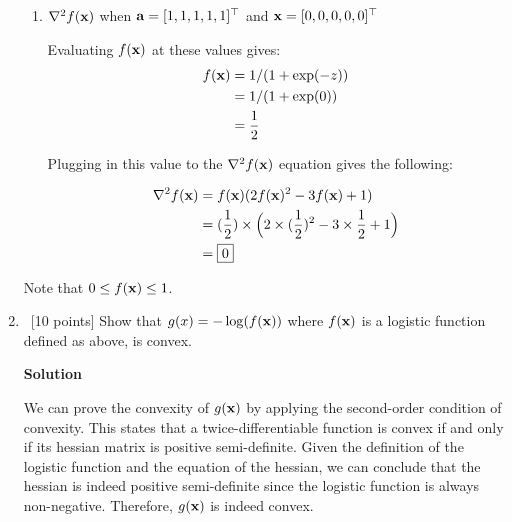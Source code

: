 \documentclass[12pt, fullpage,letterpaper]{article}
\newcommand{\solution}{\textbf{\large Solution}}
\begin{document}
\begin{enumerate}
\begin{enumerate}
\item $\nabla^2 f({\bf x})$  when ${\bf a} = [1,1,1,1,1]^\top$ and ${\bf x} = [0,0,0,0,0]^\top$

Evaluating $f({\bf x})$ at these values gives:
\[
	\begin{split}
		f({\bf x}) &= 1/(1+\exp(-z))
			\\
			&= 1/(1+\exp(0))
			\\
			&= \frac{1}{2}
	\end{split}
\]

Plugging in this value to the $\nabla^2 f({\bf x})$ equation gives the following:

	\[
		\begin{split}
			\nabla^2 f({\bf x}) &= f({\bf x})(2f({\bf x})^2 - 3 f({\bf x}) + 1)
				\\
				&= (\frac{1}{2})\times \Big(2\times(\frac{1}{2})^2 - 3 \times \frac{1}{2} + 1\Big)
				\\
				&= \boxed{0}
		\end{split}
	\]


\end{enumerate}
Note that $0 \le f({\bf x}) \le 1$.
\pagebreak
\label{sec:q8}
\item~[10 points] Show that $g(x) = -\log(f({\bf x}))$ where $f({\bf x})$ is a logistic function defined as above, is convex. 

\solution

We can prove the convexity of $g({\bf x})$ by applying the second-order condition of convexity. This states that a twice-differentiable function is convex if and only if its hessian matrix is positive semi-definite. Given the definition of the logistic function and the equation of the hessian, we can conclude that the hessian is indeed positive semi-definite since the logistic function is always non-negative. Therefore, $g({\bf x})$ is indeed convex. 


\end{enumerate}
\end{document}
